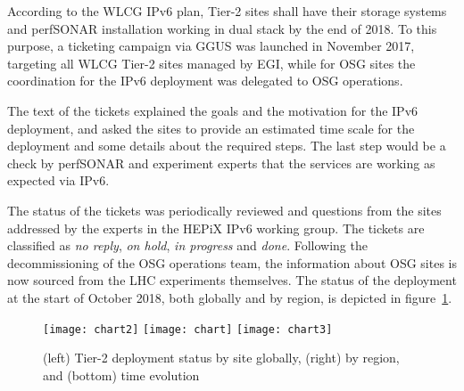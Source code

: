 According to the WLCG IPv6 plan, Tier-2 sites shall have
their storage systems and perfSONAR installation
working in dual stack by the end of 2018. To this purpose, a ticketing
campaign via GGUS was launched in November 2017, targeting all WLCG Tier-2
sites managed by EGI, while for OSG sites the coordination for the
IPv6 deployment was delegated to OSG operations.

The text of the tickets explained the goals and the motivation for the
IPv6 deployment, and asked the sites to provide an estimated time
scale for the deployment and some details about the required
steps. The last step would be a check by perfSONAR and experiment
experts that the services are working as expected via IPv6.

The status of the tickets was periodically reviewed and questions from
the sites addressed by the experts in the HEPiX IPv6 working
group. The tickets are classified as {\it no reply},
{\it on hold},
{\it in progress}
and {\it done}.
Following the decommissioning of the OSG operations team, the
information about OSG sites is now sourced from the LHC experiments
themselves. The status of the deployment at the start of October 2018, both globally and by
region, is depicted in figure~\ref{fig:t2depl}.
\begin{figure}[t]
\centering
\texttt{[image: chart2]}
\texttt{[image: chart]}
\texttt{[image: chart3]}


\caption{(left) Tier-2 deployment status by site globally, (right) by region, and (bottom) time evolution}
\label{fig:t2depl}
\end{figure}

